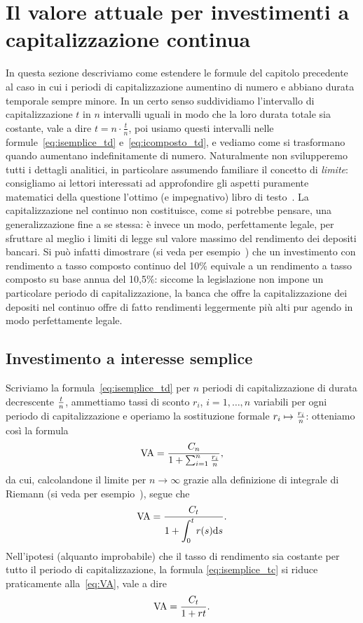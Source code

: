 \section[Capitalizzazione continua]{Il valore attuale per investimenti a capitalizzazione continua}
\label{sec:tcontinui}
In questa sezione descriviamo come estendere le formule del capitolo precedente al caso in cui i periodi di capitalizzazione
aumentino di numero e abbiano durata temporale sempre minore. In un certo senso suddividiamo l'intervallo di capitalizzazione
$t$ in $n$ intervalli uguali in modo che la loro durata totale sia costante, vale a dire $ t=n\cdot\frac{t}{n}$, poi usiamo
questi intervalli nelle formule~\eqref{eq:isemplice_td} e~\eqref{eq:icomposto_td}, e vediamo come si trasformano quando aumentano
indefinitamente di numero. Naturalmente non svilupperemo tutti i dettagli analitici, in particolare assumendo familiare il concetto
di \emph{limite}: consigliamo ai lettori interessati ad approfondire gli aspetti puramente matematici della questione l'ottimo
(e impegnativo) libro di testo~\cite{Fischer1983}.\newline
La capitalizzazione nel continuo non costituisce, come si potrebbe pensare, una generalizzazione fine a se stessa: è invece
un modo, perfettamente legale, per sfruttare al meglio i limiti di legge sul valore massimo del rendimento dei depositi bancari.
Si può infatti dimostrare (si veda per esempio~\cite[§3.3.1, p. 45, esempio 1]{brealey_et_al1999}) che un investimento con rendimento
a tasso composto continuo del 10\% equivale a un rendimento a tasso composto su base annua del 10,5\%: siccome la legislazione
non impone un particolare periodo di capitalizzazione, la banca che offre la capitalizzazione dei depositi nel continuo offre di fatto
rendimenti leggermente più alti pur agendo in modo perfettamente legale.


\subsection{Investimento a interesse semplice}
\label{sec:isemplice_tc}

Scriviamo la formula~\eqref{eq:isemplice_td} per $n$ periodi di capitalizzazione di durata decrescente $t\over n$, 
ammettiamo tassi di sconto $r_i$, $i= 1, \ldots, n$ variabili per ogni periodo di capitalizzazione e operiamo la sostituzione
formale $r_i\mapsto {r_i\over n}$: otteniamo così la formula
\[
    \mathrm{VA}=\frac{C_n}{1+\sum_{i=1}^n\frac{r_i}{n}},
\]
da cui, calcolandone il limite per $n\to \infty$ grazie alla definizione di integrale di Riemann
(si veda per esempio~\cite[chapter , §.4, pp.~629--638]{Fischer1983}), segue che
\begin{equation}
  \label{eq:isemplice_tc}
  \mathrm{VA}=\frac{C_t}{\displaystyle{1+\int_{0}^tr(s)\mathrm{d}s}}.
\end{equation}
Nell'ipotesi (alquanto improbabile) che il tasso di rendimento sia costante per tutto il periodo di capitalizzazione,
la formula \eqref{eq:isemplice_tc} si riduce praticamente alla~\eqref{eq:VA}, vale a dire
\[
  \mathrm{VA}=\frac{C_t}{1+rt}.
\]

